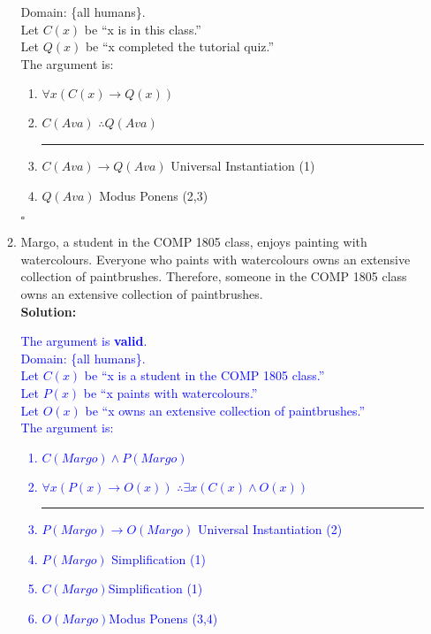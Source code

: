 \documentclass{article}
\renewcommand{\implies}{\rightarrow}
\newcommand{\sol}[1]{\textbf{Solution:\,}\textcolor{blue}{#1}}
\begin{document}
\begin{enumerate}
\begin{enumerate}
{	Domain: \{all humans\}. \\
	Let $C(x)$ be ``x is in this class.''\\
	Let $Q(x)$ be ``x completed the tutorial quiz.''\\ 
	The argument is:
\begin{enumerate}[label =(\arabic*), ref = \arabic*]
	\item $\forall x (C(x) \implies Q(x))$
	\item $C(Ava)$ \hspace{50pt} $\therefore Q(Ava)$ \vspace{3pt}
	\vspace{5pt} \hrule \vspace{5pt}
	\item $C(Ava)\implies Q(Ava)$ \hfill	Universal Instantiation (1)
	\item $Q(Ava)$ \hfill Modus Ponens (2,3)
\end{enumerate} 
\hfill $\square$
}
\item Margo, a student in the COMP 1805 class, enjoys painting with watercolours. Everyone who paints with watercolours owns an extensive collection of paintbrushes. Therefore, someone in the COMP 1805 class owns an extensive collection of paintbrushes.
\\\sol{The argument is \textbf{valid}.\\
	Domain: \{all humans\}. \\
	Let $C(x)$ be ``x is a student in the COMP 1805 class.''\\
	Let $P(x)$ be ``x paints with watercolours.''\\
	Let $O(x)$ be ``x owns an extensive collection of paintbrushes.''\\ 
	The argument is:
\begin{enumerate}[label =(\arabic*), ref = \arabic*]
	\item $C(Margo)\land P(Margo)$
	\item $\forall x(P(x)\implies O(x))$\hspace{50pt} $\therefore \exists x(C(x)\land O(x))$ \vspace{3pt}
	\vspace{5pt} \hrule \vspace{5pt}
	\item $P(Margo) \implies O(Margo)$ \hfill Universal Instantiation (2)
        \item $P(Margo)$ \hfill Simplification (1)
        \item $C(Margo)$\hfill Simplification (1)
        \item $O(Margo)$\hfill Modus Ponens (3,4)

\end{enumerate}}
\end{enumerate}
\end{enumerate}
\end{document}
